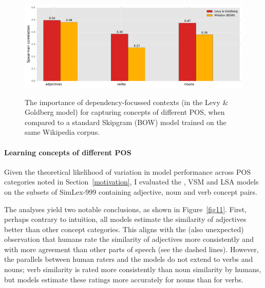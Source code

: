 \begin{figure}[]  \includegraphics[width = \textwidth,height=5cm]{Chapter_2/New_Figure_2_CL}  \caption{\label{fig12} The importance of dependency-focussed contexts (in the Levy \& Goldberg model) for capturing concepts of different POS, when compared to a standard Skipgram (BOW) model trained on the same Wikipedia corpus.}\end{figure}



\paragraph{\bf Learning concepts of different POS}
\label{begin}

Given the theoretical likelihood of variation in model performance across POS categories noted in Section~\ref{motivation}, I evaluated the \cite{mikolov2013efficient}, VSM and LSA models on the subsets of SimLex-999 containing adjective, noun and verb concept pairs. 

The analyses yield two notable conclusions, as shown in Figure~\ref{fig11}. First, perhaps contrary to intuition, all models estimate the similarity of adjectives better than other concept categories. This aligns with the (also unexpected) observation that humans rate the similarity of adjectives more consistently and with more agreement than other parts of speech (see the dashed lines). However, the parallels between human raters and the models do not extend to verbs and nouns; verb similarity is rated more consistently than noun similarity by humans, but models estimate these ratings more accurately for nouns than for verbs. 

